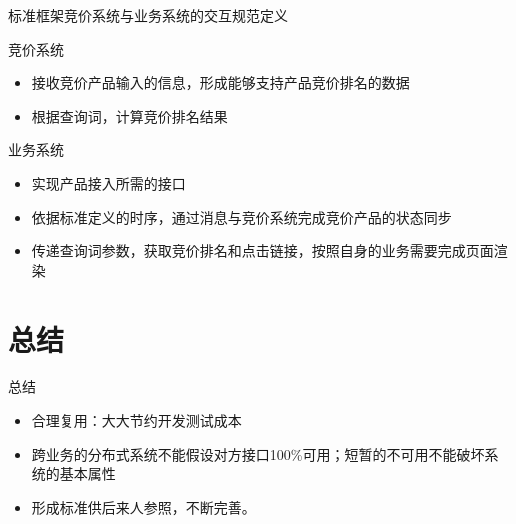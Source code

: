 \documentclass{beamer}
\begin{document}
\begin{CJK}{UTF8}{gbsn}
\begin{frame}{标准框架}{竞价系统与业务系统的交互规范定义}
  \begin{block}{竞价系统}
    \begin{itemize}
    \item {接收竞价产品输入的信息，形成能够支持产品竞价排名的数据}
    \item {根据查询词，计算竞价排名结果}
    \end{itemize}
    \pause
  \end{block}
  \begin{block}{业务系统}
    \begin{itemize}
    \item {
      实现产品接入所需的接口
      \pause
    }
    \item {
      依据标准定义的时序，通过消息与竞价系统完成竞价产品的状态同步
      \pause
    }
    \item {
      传递查询词参数，获取竞价排名和点击链接，按照自身的业务需要完成页面渲染
    }
    \end{itemize}
  \end{block}
\end{frame}

\section*{总结}

\begin{frame}{总结}
  \begin{itemize}
    \item {
      合理复用：大大节约开发测试成本
    }
    \item {
      跨业务的分布式系统不能假设对方接口100\%可用；短暂的不可用不能破坏系统的基本属性
    }
    \item {
      形成标准供后来人参照，不断完善。
    }
  \end{itemize}
\end{frame}




\end{CJK}
\end{document}
